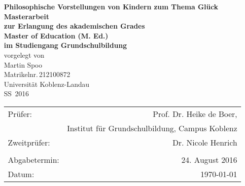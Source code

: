 \begin{titlepage}
	\begin{center}
		\quad
		\vfill
		\Huge{
			 \textbf{Philosophische Vorstellungen von Kindern zum Thema \glqq Glück\grqq}
		}
		\vspace{5mm}
		\vfill
		\large{
			{\bfseries Masterarbeit\\
			\vspace{5mm}
			\normalfont \rmfamily zur Erlangung des akademischen Grades\\
			\bfseries Master of Education (M. Ed.)\\
			\vspace{5mm}
			\normalfont \rmfamily im Studiengang Grundschulbildung}
		}
		\\
		\vspace{1.5cm}
		\large{
			{vorgelegt von\\
			Martin Spoo\\
			Matrikelnr.\,212100872}
		}
		\vspace{1cm}
		\\
		\Large{
			{Universität Koblenz-Landau}\\
			{SS\, 2016}
		}
		\vspace{1cm}
		\begin{table}[b]
			\begin{center}
				\begin{tabular}{lr}
					Prüfer: &  Prof. Dr. Heike de Boer, \\
								&	Institut für Grundschulbildung, Campus Koblenz \\
					Zweitprüfer: & Dr. Nicole Henrich \\
					\vspace{0.25cm} \\
					Abgabetermin: & 24. August 2016 \\
					Datum: & \today
				\end{tabular}
			\end{center}
		\end{table}
	\end{center}
\end{titlepage}
\renewcommand{\baselinestretch}{1.1}
\restoregeometry

